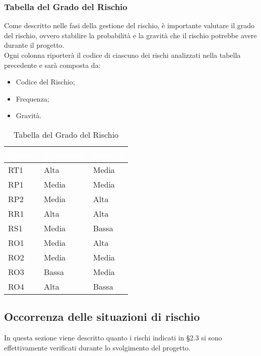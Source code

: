 {\begin{longtable}{ C{2cm} C{4cm} C{4cm} C{4.9cm}}
\end{longtable}
}

\subsubsection{Tabella del Grado del Rischio}
Come descritto nelle fasi della gestione del rischio, è importante valutare il grado del rischio, ovvero stabilire la probabilità e la gravità che il rischio potrebbe avere durante il progetto.\\
Ogni colonna riporterà il codice di ciascuno dei rischi analizzati nella tabella precedente e sarà composta da:
\begin{itemize}
	\item Codice del Rischio;
	\item Frequenza;
	\item Gravità.
\end{itemize}

{
\renewcommand{\arraystretch}{2}
\centering
	
\begin{longtable}{C{2cm} C{3cm} C{3cm}}
\caption{Tabella del Grado del Rischio}\\

\textcolor{white}{\textbf{Codice}} & 
\textcolor{white}{\textbf{Frequenza}} & 
\textcolor{white}{\textbf{Gravità}}\\	
\endhead

RT1 &  Alta & Media \\
RP1 & Media & Media \\
RP2 & Media &  Alta \\
RR1 &  Alta &  Alta \\
RS1 & Media & Bassa \\
RO1 & Media &  Alta \\
RO2 & Media & Media \\
RO3 & Bassa & Media \\
RO4 &  Alta & Bassa \\

\end{longtable}
}

\clearpage

\subsection{Occorrenza delle situazioni di rischio}
In questa sezione viene descritto quanto i rischi indicati in §2.3 si sono effettivamente verificati durante lo svolgimento del progetto.
